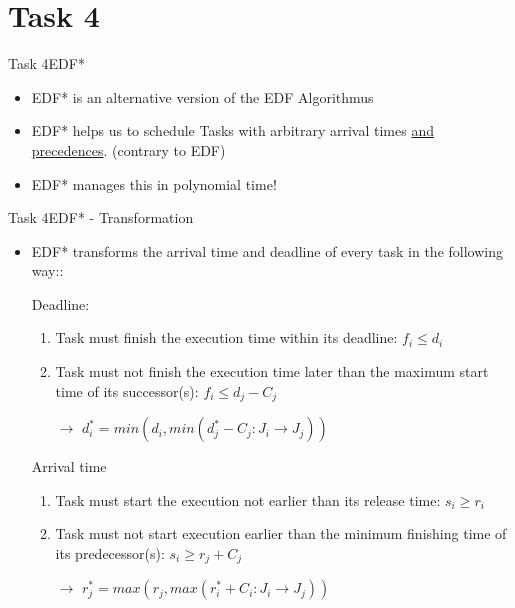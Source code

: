 
\section{Task 4}

\setcounter{task}{1}

\begin{frame}{Task 4}{EDF*}
\begin{itemize}
    \item EDF* is an alternative version of the EDF Algorithmus
    \item EDF* helps us to schedule Tasks with arbitrary arrival times \alert{\underline{and precedences}}. (contrary to EDF)
    \item EDF* manages this in polynomial time!
\end{itemize}
\end{frame}

\begin{frame}[allowframebreaks]{Task 4}{EDF* - Transformation}
\begin{itemize}
    \item EDF* transforms the arrival time and deadline of every task in the following way::
    \item[] \alert{Deadline}: \begin{enumerate}
        \item Task must finish the execution time within its deadline: $f_i \leq d_i$
        \item Task must not finish the execution time later than the maximum start time of its successor(s): $f_i \leq d_j - C_j$
        \item[$\rightarrow$] $d_i^* = min(d_i, min(d_j^* - C_j : J_i \rightarrow J_j))$
    \end{enumerate}
    \framebreak
    \item[] \alert{Arrival time} \begin{enumerate}
        \item Task must start the execution not earlier than its release time: $s_i \geq r_i$
        \item Task must not start execution earlier than the minimum finishing time of its predecessor(s): $s_i \geq r_j + C_j$
        \item[$\rightarrow$] $r_j^* = max(r_j, max(r_i^* + C_i : J_i \rightarrow J_j))$
    \end{enumerate}
\end{itemize}
\end{frame}

